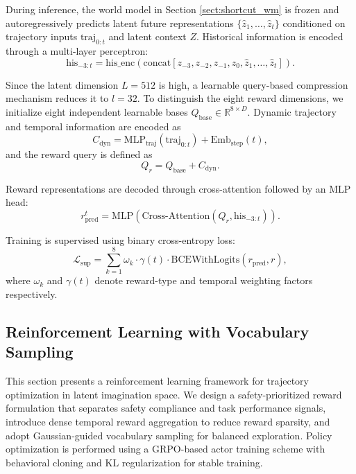 \documentclass[runningheads]{llncs}
\begin{document}
During inference, the world model in Section \ref{sect:shortcut_wm} is frozen and autoregressively predicts latent future representations $\{\hat{z}_1,\dots,\hat{z}_t\}$ conditioned on trajectory inputs $\text{traj}_{0:t}$ and latent context $Z$. Historical information is encoded through a multi-layer perceptron:
\begin{equation}
\text{his}_{-3:t}=\text{his\_enc}(\text{concat}[z_{-3},z_{-2},z_{-1},z_0,\hat{z}_1,\dots,\hat{z}_t]).
\end{equation}

Since the latent dimension $L=512$ is high, a learnable query-based compression mechanism reduces it to $l=32$. To distinguish the eight reward dimensions, we initialize eight independent learnable bases $Q_{\text{base}}\in\mathbb{R}^{8\times D}$. Dynamic trajectory and temporal information are encoded as
\begin{equation}
C_{\text{dyn}}=\text{MLP}_{\text{traj}}(\text{traj}_{0:t})+\text{Emb}_{\text{step}}(t),
\end{equation}
and the reward query is defined as
\begin{equation}
Q_r=Q_{\text{base}}+C_{\text{dyn}}.
\end{equation}

Reward representations are decoded through cross-attention followed by an MLP head:
\begin{equation}
r_{\text{pred}}^t=\text{MLP}(\text{Cross-Attention}(Q_r,\text{his}_{-3:t})).
\end{equation}

Training is supervised using binary cross-entropy loss:
\begin{equation}
\mathcal{L}_{\text{sup}}=\sum_{k=1}^{8}\omega_k\cdot\gamma(t)\cdot\text{BCEWithLogits}(r_{\text{pred}},r),
\end{equation}
where $\omega_k$ and $\gamma(t)$ denote reward-type and temporal weighting factors respectively.

\subsection{Reinforcement Learning with Vocabulary Sampling}

\label{sect:rl}
This section presents a reinforcement learning framework for trajectory optimization in latent imagination space. We design a safety-prioritized reward formulation that separates safety compliance and task performance signals, introduce dense temporal reward aggregation to reduce reward sparsity, and adopt Gaussian-guided vocabulary sampling for balanced exploration. Policy optimization is performed using a GRPO-based actor training scheme with behavioral cloning and KL regularization for stable training.
\end{document}
